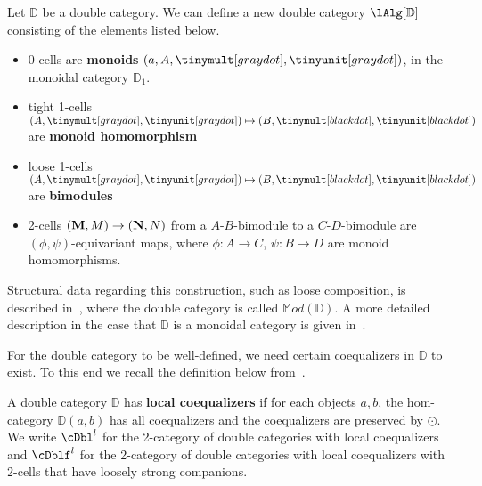 \begin{defn}
Let ${\mathbb{D}}$ be a double category. We can define a new double category $\lAlg[{\mathbb{D}}]$ consisting of the elements listed below.

\begin{itemize}
\item 0-cells are {\bf monoids} $(a, A,\tinymult[gray dot], \tinyunit[gray dot])$, in the monoidal category ${\mathbb{D}_1}$. 
\item tight 1-cells $(A,\tinymult[gray dot], \tinyunit[gray dot]) \mapsto (B,\tinymult[black dot], \tinyunit[black dot])$ are {\bf monoid homomorphism}
\item loose 1-cells $(A,\tinymult[gray dot], \tinyunit[gray dot]) \mapsto (B,\tinymult[black dot], \tinyunit[black dot])$ are {\bf bimodules}
\item 2-cells $({\bf M},M) \rightarrow ({\bf N},N)$ from a $A$-$B$-bimodule to a $C$-$D$-bimodule are $(\phi, \psi)$-equivariant maps, where $\phi:  A\rightarrow C$, $\psi: B \rightarrow D$ are monoid homomorphisms.  
\end{itemize}
Structural data regarding this construction, such as loose composition, is described in~\cite{shulman:frbi}, where the double category is called $\mathbb{M}od(\mathbb{D})$. A more detailed description in the case that $\mathbb{D}$ is a monoidal category is given in~\cite{westerPhDthesis}.
\end{defn}

For the double category to be well-defined, we need certain coequalizers in $\mathbb{D}$ to exist. To this end we recall the definition below from~\cite[Definition 11.4]{shulman:frbi}.

\begin{defn}
A double category $\mathbb{D}$ has {\bf local coequalizers} if for each objects $a,b$, the hom-category $\mathbb{D}(a,b)$ has all coequalizers and the coequalizers are preserved by $\odot$. We write $\cDbl^l$ for the 2-category of double categories with local coequalizers and $\cDblf^l$ for the 2-category of double categories with local coequalizers with 2-cells that have loosely strong companions.
\end{defn}

